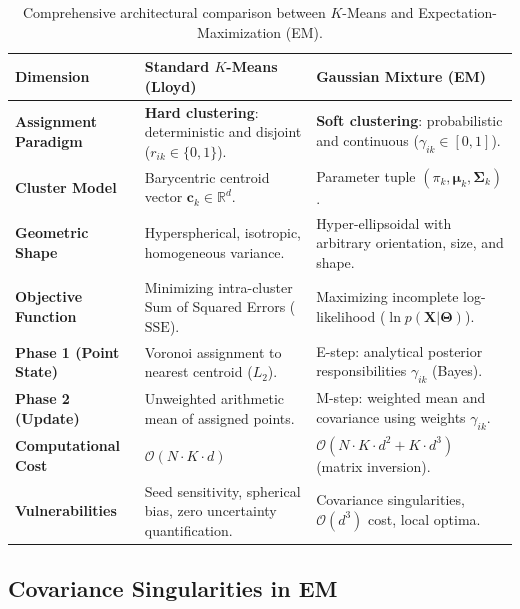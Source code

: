 \begin{table}[htbp]
    \centering
    \small
    \renewcommand{\arraystretch}{1.3}
    \begin{tabularx}{\textwidth}{>{\raggedright\arraybackslash\bfseries}p{3.3cm} Y Y}
        \toprule
        \textbf{Dimension} & \textbf{Standard $K$-Means (Lloyd)} & \textbf{Gaussian Mixture (EM)} \\
        \midrule
        Assignment Paradigm & \textbf{Hard clustering}: deterministic and disjoint ($r_{ik} \in \{0, 1\}$). & \textbf{Soft clustering}: probabilistic and continuous ($\gamma_{ik} \in [0, 1]$). \\
        \addlinespace[3pt]
        Cluster Model & Barycentric centroid vector $\mathbf{c}_k \in \mathbb{R}^d$. & Parameter tuple $(\pi_k, \boldsymbol{\mu}_k, \boldsymbol{\Sigma}_k)$. \\
        \addlinespace[3pt]
        Geometric Shape & Hyperspherical, isotropic, homogeneous variance. & Hyper-ellipsoidal with arbitrary orientation, size, and shape. \\
        \addlinespace[3pt]
        Objective Function & Minimizing intra-cluster Sum of Squared Errors ($\mathrm{SSE}$). & Maximizing incomplete log-likelihood ($\ln p(\mathbf{X}|\boldsymbol{\Theta})$). \\
        \addlinespace[3pt]
        Phase 1 (Point State) & Voronoi assignment to nearest centroid ($L_2$). & E-step: analytical posterior responsibilities $\gamma_{ik}$ (Bayes). \\
        \addlinespace[3pt]
        Phase 2 (Update) & Unweighted arithmetic mean of assigned points. & M-step: weighted mean and covariance using weights $\gamma_{ik}$. \\
        \addlinespace[3pt]
        Computational Cost & $\mathcal{O}(N \cdot K \cdot d)$ & $\mathcal{O}(N \cdot K \cdot d^2 + K \cdot d^3)$ (matrix inversion). \\
        \addlinespace[3pt]
        Vulnerabilities & Seed sensitivity, spherical bias, zero uncertainty quantification. & Covariance singularities, $\mathcal{O}(d^3)$ cost, local optima. \\
        \bottomrule
    \end{tabularx}
    \caption{Comprehensive architectural comparison between $K$-Means and Expectation-Maximization (EM).}
    \label{tab:dm-kmeans-em-detailed-comparison}
\end{table}

\subsection{Covariance Singularities in EM}

